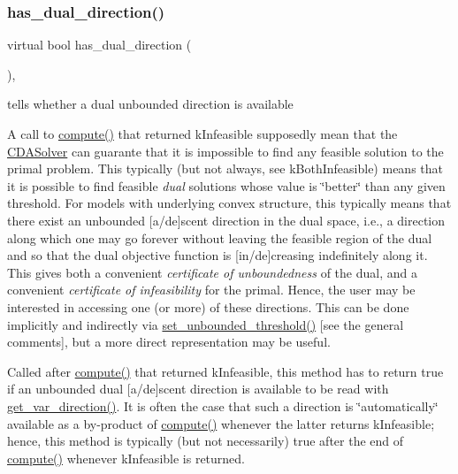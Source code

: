 \subsubsection{\texorpdfstring{has\+\_\+dual\+\_\+direction()}{has\_dual\_direction()}}
{\footnotesize\ttfamily virtual bool has\+\_\+dual\+\_\+direction (\begin{DoxyParamCaption}\item[{void}]{ }\end{DoxyParamCaption})\hspace{0.3cm}{\ttfamily [inline]}, {\ttfamily [virtual]}}



tells whether a dual unbounded direction is available 

A call to \mbox{\hyperlink{class_s_m_spp__di__unipi__it_1_1_solver_a504d4e3e174c7a518cc66156a8a45ce5}{compute()}} that returned k\+Infeasible supposedly mean that the \mbox{\hyperlink{class_s_m_spp__di__unipi__it_1_1_c_d_a_solver}{C\+D\+A\+Solver}} can guarante that it is impossible to find any feasible solution to the primal problem. This typically (but not always, see k\+Both\+Infeasible) means that it is possible to find feasible {\itshape dual} solutions whose value is \char`\"{}better\char`\"{} than any given threshold. For models with underlying convex structure, this typically means that there exist an unbounded \mbox{[}a/de\mbox{]}scent direction in the dual space, i.\+e., a direction along which one may go forever without leaving the feasible region of the dual and so that the dual objective function is \mbox{[}in/de\mbox{]}creasing indefinitely along it. This gives both a convenient {\itshape certificate of unboundedness} of the dual, and a convenient {\itshape certificate of infeasibility} for the primal. Hence, the user may be interested in accessing one (or more) of these directions. This can be done implicitly and indirectly via \mbox{\hyperlink{class_s_m_spp__di__unipi__it_1_1_solver_ae1717d1363782e086aa797e7437c0352}{set\+\_\+unbounded\+\_\+threshold()}} \mbox{[}see the general comments\mbox{]}, but a more direct representation may be useful.

Called after \mbox{\hyperlink{class_s_m_spp__di__unipi__it_1_1_solver_a504d4e3e174c7a518cc66156a8a45ce5}{compute()}} that returned k\+Infeasible, this method has to return true if an unbounded dual \mbox{[}a/de\mbox{]}scent direction is available to be read with \mbox{\hyperlink{class_s_m_spp__di__unipi__it_1_1_solver_a4bc119810c0c2ee3ba0c48183f50aaf4}{get\+\_\+var\+\_\+direction()}}. It is often the case that such a direction is \char`\"{}automatically\char`\"{} available as a by-\/product of \mbox{\hyperlink{class_s_m_spp__di__unipi__it_1_1_solver_a504d4e3e174c7a518cc66156a8a45ce5}{compute()}} whenever the latter returns k\+Infeasible; hence, this method is typically (but not necessarily) true after the end of \mbox{\hyperlink{class_s_m_spp__di__unipi__it_1_1_solver_a504d4e3e174c7a518cc66156a8a45ce5}{compute()}} whenever k\+Infeasible is returned.

